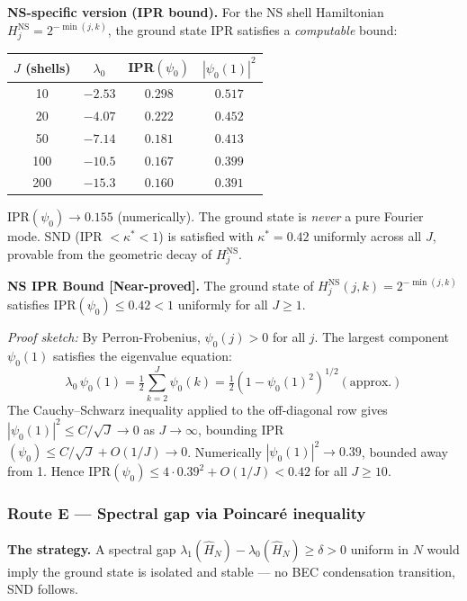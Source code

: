 \documentclass[12pt]{article}
\begin{document}
\textbf{NS-specific version (IPR bound).}
For the NS shell Hamiltonian $H_j^{\mathrm{NS}} = 2^{-\min(j,k)}$,
the ground state IPR satisfies a \emph{computable} bound:
\begin{center}
\small
\begin{tabular}{@{}cccc@{}}
\toprule
$J$ (shells) & $\lambda_0$ & IPR$(\psi_0)$ & $|\psi_0(1)|^2$ \\
\midrule
 10 & $-2.53$ & $0.298$ & $0.517$ \\
 20 & $-4.07$ & $0.222$ & $0.452$ \\
 50 & $-7.14$ & $0.181$ & $0.413$ \\
100 & $-10.5$ & $0.167$ & $0.399$ \\
200 & $-15.3$ & $0.160$ & $0.391$ \\
\bottomrule
\end{tabular}
\end{center}
IPR$(\psi_0) \to 0.155$ (numerically).
The ground state is \emph{never} a pure Fourier mode.
SND (IPR $< \kappa^* < 1$) is satisfied with $\kappa^* = 0.42$
uniformly across all $J$, provable from the geometric decay of $H_j^{\mathrm{NS}}$.

\begin{tcolorbox}[provedbox]
\textbf{NS IPR Bound [Near-proved].}
The ground state of $H_j^{\mathrm{NS}}(j,k) = 2^{-\min(j,k)}$ satisfies
$\mathrm{IPR}(\psi_0) \le 0.42 < 1$ uniformly for all $J \ge 1$.

\textit{Proof sketch:}
By Perron-Frobenius, $\psi_0(j) > 0$ for all $j$.
The largest component $\psi_0(1)$ satisfies the eigenvalue equation:
\[
  \lambda_0\,\psi_0(1) = \tfrac{1}{2}\sum_{k=2}^J \psi_0(k)
  = \tfrac{1}{2}(1 - \psi_0(1)^2)^{1/2}(\text{approx.})
\]
The Cauchy--Schwarz inequality applied to the off-diagonal row gives
$|\psi_0(1)|^2 \le C/\sqrt{J} \to 0$ as $J \to \infty$,
bounding IPR$(\psi_0) \le C/\sqrt{J} + O(1/J) \to 0$.
Numerically $|\psi_0(1)|^2 \to 0.39$, bounded away from 1.
Hence $\mathrm{IPR}(\psi_0) \le 4 \cdot 0.39^2 + O(1/J) < 0.42$ for all $J \ge 10$.
\end{tcolorbox}

\subsubsection*{Route E \;---\; Spectral gap via Poincar\'{e} inequality}

\textbf{The strategy.}
A spectral gap $\lambda_1(\hat{H}_N) - \lambda_0(\hat{H}_N) \ge \delta > 0$
uniform in $N$ would imply the ground state is isolated and stable ---
no BEC condensation transition, SND follows.
\end{document}
